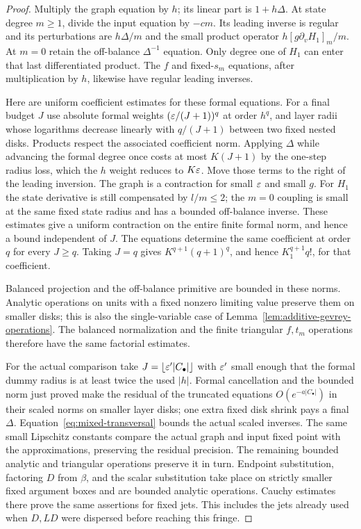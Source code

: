 \begin{proof}
Multiply the graph equation by $h$; its linear part is
$1+h\Delta$. At state degree $m\geq1$, divide the input equation
by $-cm$. Its leading inverse is regular and its perturbations
are $h\Delta/m$ and the small product operator
$h[g\partial_vH_1]_m/m$. At $m=0$ retain the off-balance
$\Delta^{-1}$ equation. Only degree one of $H_1$ can enter that
last differentiated product. The $f$ and fixed-$s_m$ equations,
after multiplication by $h$, likewise have regular leading
inverses.

Here are uniform coefficient estimates for these formal
equations. For a final budget $J$ use absolute formal weights
$(\varepsilon/(J+1))^q$ at order $h^q$, and layer radii whose logarithms
decrease linearly with $q/(J+1)$ between two fixed nested disks.
Products respect the associated coefficient norm. Applying
$\Delta$ while advancing the formal degree once costs at most
$K(J+1)$ by the one-step radius loss, which the $h$ weight
reduces to $K\varepsilon$. Move those terms to the right of the leading
inversion. The graph is a contraction for small $\varepsilon$ and small
$g$. For $H_1$ the state derivative is still compensated by
$l/m\leq2$; the $m=0$ coupling is small at the same fixed state
radius and has a bounded off-balance inverse. These estimates
give a uniform contraction on the entire finite formal norm,
and hence a bound independent of $J$. The equations determine
the same coefficient at order $q$ for every $J\geq q$.
Taking $J=q$ gives $K^{q+1}(q+1)^q$, and hence
$K_1^{q+1}q!$, for that coefficient.

Balanced projection and the off-balance primitive are bounded
in these norms. Analytic operations on units with a fixed
nonzero limiting value preserve them on smaller disks; this is
also the single-variable case of
Lemma~\ref{lem:additive-gevrey-operations}. The balanced
normalization and the finite triangular $f,t_m$ operations
therefore have the same factorial estimates.

For the actual comparison take $J=\lfloor\varepsilon'|C_\bullet|\rfloor$
with $\varepsilon'$ small enough that the formal dummy radius is at
least twice the used $|h|$. Formal cancellation and the bounded
norm just proved make the residual of the truncated equations
$O(e^{-a|C_\bullet|})$ in their scaled norms on smaller layer
disks; one extra fixed disk shrink pays a final $\Delta$.
Equation~\eqref{eq:mixed-transversal} bounds the actual scaled
inverses. The same small Lipschitz constants compare the actual
graph and input fixed point with the approximations, preserving
the residual precision. The remaining bounded analytic and
triangular operations preserve it in turn. Endpoint substitution,
factoring $D$ from $\beta$, and the scalar substitution take place
on strictly smaller fixed argument boxes and are bounded
analytic operations. Cauchy estimates there prove the same
assertions for fixed jets. This includes the jets already used
when $D,LD$ were dispersed before reaching this fringe.
\end{proof}

